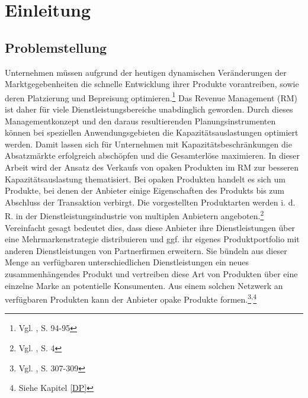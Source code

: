 \chapter{Einleitung}

\section{Problemstellung}
Unternehmen müssen aufgrund der heutigen dynamischen Veränderungen der Marktgegebenheiten die schnelle Entwicklung ihrer Produkte vorantreiben, sowie deren Platzierung und Bepreisung optimieren.\footnote{Vgl. \cite{gonsch2013using}, S. 94-95\label{dingens1}} Das Revenue Management (RM) ist daher für viele Dienstleistungsbereiche unabdinglich geworden. Durch dieses Managementkonzept und den daraus resultierenden Planungsinstrumenten können bei speziellen Anwendungsgebieten die Kapazitätsauslastungen optimiert werden. Damit lassen sich für Unternehmen mit Kapazitätsbe\-schränkungen die Absatzmärkte erfolgreich abschöpfen und die Gesamterlöse maximieren. In dieser Arbeit wird der Ansatz des Verkaufs von opaken Produkten im RM zur besseren Kapazitätsauslastung thematisiert. %
Bei opaken Produkten handelt es sich um Produkte, bei denen der Anbieter einige Eigenschaften des Produkts bis zum Abschluss der Transaktion verbirgt. %
Die vorgestellten Produktarten werden i. d. R. in der Dienstleistungsindustrie von multiplen Anbietern angeboten.\footnote{Vgl. \cite{Klein:2008aa}, S. 4} Vereinfacht gesagt bedeutet dies, dass diese Anbieter ihre Dienstleistungen über eine Mehrmarkenstrategie distribuieren und ggf. ihr eigenes Produktportfolio mit anderen Dienstleistungen von Partnerfirmen erweitern. Sie bündeln aus dieser Menge an verfügbaren unterschiedlichen Dienstleistungen ein neues zusammenhängendes Produkt und vertreiben diese Art von Produkten über eine einzelne Marke an potentielle Konsumenten. Aus einem solchen Netzwerk an verfügbaren Produkten kann der Anbieter opake Produkte formen.\footnote{Vgl. \cite{anderson2009effectiveness}, S. 307-309}\textsuperscript{,}\footnote{Siehe Kapitel \ref{DP}}\\


